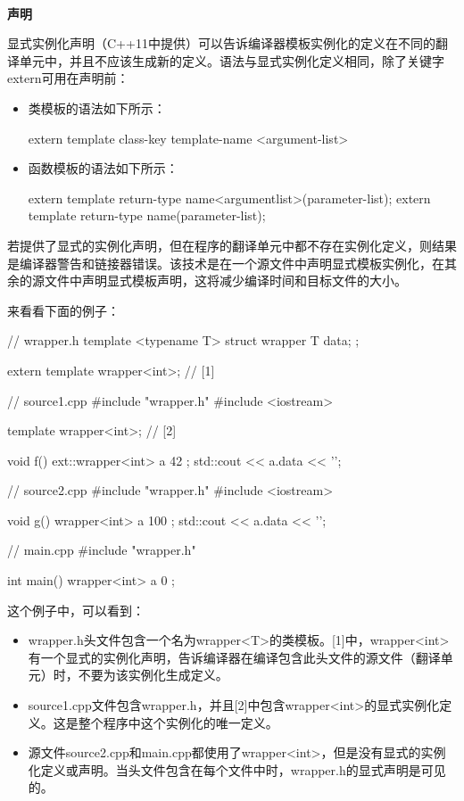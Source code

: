 \hspace*{\fill} \\ %
\noindent\textbf{声明}

显式实例化声明（C++11中提供）可以告诉编译器模板实例化的定义在不同的翻译单元中，并且不应该生成新的定义。语法与显式实例化定义相同，除了关键字extern可用在声明前：

\begin{itemize}
  \item 类模板的语法如下所示：
\begin{cpp}
extern template class-key template-name <argument-list>
\end{cpp}
  \item 函数模板的语法如下所示：
\begin{cpp}
extern template return-type name<argumentlist>(parameter-list);
extern template return-type name(parameter-list);
\end{cpp}
\end{itemize}

若提供了显式的实例化声明，但在程序的翻译单元中都不存在实例化定义，则结果是编译器警告和链接器错误。该技术是在一个源文件中声明显式模板实例化，在其余的源文件中声明显式模板声明，这将减少编译时间和目标文件的大小。

来看看下面的例子：

\begin{cpp}
// wrapper.h
template <typename T>
struct wrapper
{
	T data;
};

extern template wrapper<int>; // [1]

// source1.cpp
#include "wrapper.h"
#include <iostream>

template wrapper<int>; // [2]

void f()
{
	ext::wrapper<int> a{ 42 };
	std::cout << a.data << '\n';
}

// source2.cpp
#include "wrapper.h"
#include <iostream>

void g()
{
	wrapper<int> a{ 100 };
	std::cout << a.data << '\n';
}

// main.cpp
#include "wrapper.h"

int main()
{
	wrapper<int> a{ 0 };
}
\end{cpp}

这个例子中，可以看到：

\begin{itemize}
  \item wrapper.h头文件包含一个名为wrapper<T>的类模板。[1]中，wrapper<int>有一个显式的实例化声明，告诉编译器在编译包含此头文件的源文件（翻译单元）时，不要为该实例化生成定义。
  \item source1.cpp文件包含wrapper.h，并且[2]中包含wrapper<int>的显式实例化定义。这是整个程序中这个实例化的唯一定义。
  \item 源文件source2.cpp和main.cpp都使用了wrapper<int>，但是没有显式的实例化定义或声明。当头文件包含在每个文件中时，wrapper.h的显式声明是可见的。
\end{itemize}

